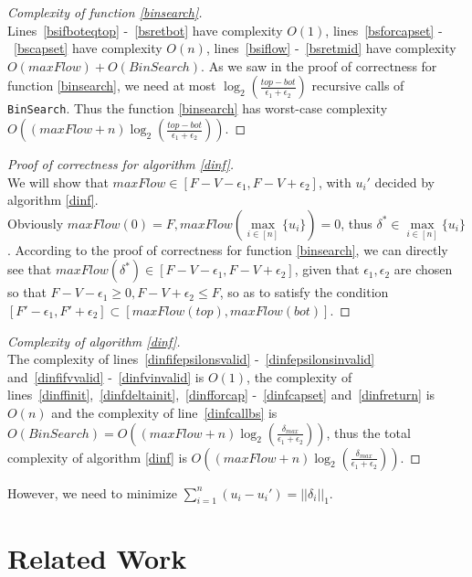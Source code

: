 \documentclass[11pt]{article}
\theoremstyle{definition}
\theoremstyle{corollary}
\theoremstyle{lemma}
\begin{document}
    \begin{proof}[Complexity of function \ref{binsearch}] \ \\
       Lines~\ref{bsifboteqtop} -~\ref{bsretbot} have complexity $O(1)$, lines~\ref{bsforcapset} -~\ref{bscapset} have
       complexity $O(n)$, lines~\ref{bsiflow} -~\ref{bsretmid} have complexity $O(maxFlow) + O(BinSearch)$. As we saw in the
       proof of correctness for function \ref{binsearch}, we need at most $\log_2(\frac{top - bot}{\epsilon_1 +
       \epsilon_2})$ recursive calls of \texttt{BinSearch}. Thus the function \ref{binsearch} has worst-case complexity
       $O((maxFlow + n)\log_2(\frac{top - bot}{\epsilon_1 + \epsilon_2}))$.
    \end{proof}
    \begin{proof}[Proof of correctness for algorithm \ref{dinf}] \ \\
       We will show that $maxFlow \in [F - V - \epsilon_1, F - V + \epsilon_2]$, with $u_i'$ decided by algorithm
       \ref{dinf}. \\
       Obviously $maxFlow(0) = F, maxFlow(\max\limits_{i \in [n]}\{u_i\}) = 0$, thus $\delta^* \in
       \max\limits_{i \in [n]}\{u_i\}$. According to the proof of correctness for function \ref{binsearch},
       we can directly see that $maxFlow(\delta^*) \in [F - V - \epsilon_1, F - V + \epsilon_2]$, given that
       $\epsilon_1, \epsilon_2$ are chosen so that $F - V - \epsilon_1 \geq 0, F - V + \epsilon_2 \leq F$, so as to satisfy
       the condition $[F' - \epsilon_1, F' + \epsilon_2] \subset [maxFlow(top),maxFlow(bot)]$.
    \end{proof}
    \begin{proof}[Complexity of algorithm \ref{dinf}] \ \\
       The complexity of lines~\ref{dinfifepsilonsvalid} -~\ref{dinfepsilonsinvalid} and~\ref{dinfifvvalid}
       -~\ref{dinfvinvalid} is $O(1)$, the complexity of lines~\ref{dinffinit},~\ref{dinfdeltainit},~\ref{dinfforcap}
       -~\ref{dinfcapset} and~\ref{dinfreturn} is $O(n)$ and the complexity of line~\ref{dinfcallbs} is $O(BinSearch) =
       O((maxFlow + n) \log_2(\frac{\delta_{max}}{\epsilon_1 + \epsilon_2}))$, thus the total complexity of algorithm
       \ref{dinf} is $O((maxFlow + n)\log_2(\frac{\delta_{max}}{\epsilon_1 + \epsilon_2}))$.
    \end{proof}

    However, we need to minimize $\sum\limits_{i=1}^{n}(u_i-u_i') = ||\delta_i||_1$.

  \section{Related Work}
\end{document}
